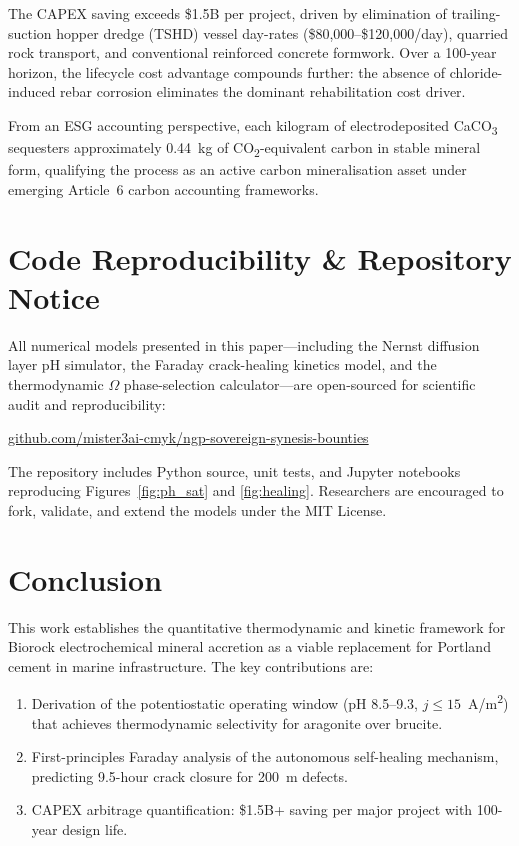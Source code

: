 \documentclass[journal,twocolumn]{IEEEtran}
\begin{document}
The CAPEX saving exceeds \$1.5B per project, driven by elimination of trailing-suction hopper dredge (TSHD) vessel day-rates (\$80,000--\$120,000/day), quarried rock transport, and conventional reinforced concrete formwork. Over a 100-year horizon, the lifecycle cost advantage compounds further: the absence of chloride-induced rebar corrosion eliminates the dominant rehabilitation cost driver.

From an ESG accounting perspective, each kilogram of electrodeposited CaCO\textsubscript{3} sequesters approximately 0.44~kg of CO\textsubscript{2}-equivalent carbon in stable mineral form, qualifying the process as an active carbon mineralisation asset under emerging Article~6 carbon accounting frameworks.

\section{Code Reproducibility \& Repository Notice}

All numerical models presented in this paper---including the Nernst diffusion layer pH simulator, the Faraday crack-healing kinetics model, and the thermodynamic $\Omega$ phase-selection calculator---are open-sourced for scientific audit and reproducibility:

\begin{center}
\url{github.com/mister3ai-cmyk/ngp-sovereign-synesis-bounties}
\end{center}

The repository includes Python source, unit tests, and Jupyter notebooks reproducing Figures~\ref{fig:ph_sat} and \ref{fig:healing}. Researchers are encouraged to fork, validate, and extend the models under the MIT License.

\section{Conclusion}

This work establishes the quantitative thermodynamic and kinetic framework for Biorock electrochemical mineral accretion as a viable replacement for Portland cement in marine infrastructure. The key contributions are:

\begin{enumerate}
  \item Derivation of the potentiostatic operating window (pH 8.5--9.3, $j \leq 15$~A/m\textsuperscript{2}) that achieves thermodynamic selectivity for aragonite over brucite.
  \item First-principles Faraday analysis of the autonomous self-healing mechanism, predicting 9.5-hour crack closure for 200~\textmu m defects.
  \item CAPEX arbitrage quantification: \$1.5B+ saving per major project with 100-year design life.
\end{enumerate}
\end{document}
